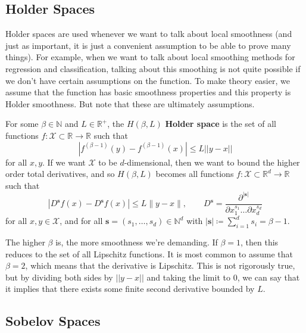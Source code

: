 \subsection{Holder Spaces}

  Holder spaces are used whenever we want to talk about local smoothness (and just as important, it is just a convenient assumption to be able to prove many things). For example, when we want to talk about local smoothing methods for regression and classification, talking about this smoothing is not quite possible if we don't have certain assumptions on the function. To make theory easier, we assume that the function has basic smoothness properties and this property is Holder smoothness. But note that these are ultimately assumptions. 

  \begin{definition}
    For some $\beta \in \mathbb{N}$ and $L \in \mathbb{R}^+$, the $H(\beta, L)$ \textbf{Holder space} is the set of all functions $f: \mathcal{X} \subset \mathbb{R} \rightarrow \mathbb{R}$ such that 
    \begin{equation}
      |f^{(\beta - 1)}(y) - f^{(\beta - 1)}(x)| \leq L ||y - x||
    \end{equation}
    for all $x, y$. If we want $\mathcal{X}$ to be $d$-dimensional, then we want to bound the higher order total derivatives, and so $H(\beta, L)$ becomes all functions $f: \mathcal{X} \subset \mathbb{R}^d \rightarrow \mathbb{R}$ such that 
    \begin{equation}
      |D^{\mathbf{s}} f(x) - D^{\mathbf{s}} f(x)| \leq L \|y - x\|, \qquad D^{\mathbf{s}} = \frac{\partial^{|\mathbf{s}|}}{\partial x_1^{s_1} \ldots \partial x_d^{s_d}} 
    \end{equation}
    for all $x, y \in \mathcal{X}$, and for all $\mathbf{s} = (s_1, \ldots, s_d) \in \mathbb{N}^d$ with $|\mathbf{s}| \coloneqq \sum_{i=1}^d s_i = \beta - 1$. 
  \end{definition}

  The higher $\beta$ is, the more smoothness we're demanding. If $\beta = 1$, then this reduces to the set of all Lipschitz functions. It is most common to assume that $\beta = 2$, which means that the derivative is Lipschitz. This is not rigorously true, but by dividing both sides by $||y - x||$ and taking the limit to $0$, we can say that it implies that there exists some finite second derivative bounded by $L$. 

\subsection{Sobelov Spaces}


